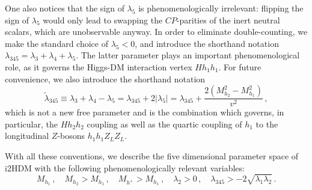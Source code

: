 One also notices that the sign of $\lambda_5$ is phenomenologically irrelevant: 
flipping the sign of $\lambda_5$ would only lead to swapping the $CP$-parities
of the inert neutral scalars, which are unobservable anyway.
In order to eliminate double-counting, we make the standard choice of $\lambda_5 < 0$,
and introduce the shorthand notation $\lambda_{345}=\lambda_3+\lambda_4+\lambda_5$.
The latter parameter plays an important phenomenological role, as it governs the Higgs-DM interaction vertex $H h_1 h_1$.
For future convenience, we also introduce the shorthand notation
\begin{equation}
\tilde\lambda_{345} \equiv \lambda_3+\lambda_4-\lambda_5 = \lambda_{345} + 2|\lambda_5| = 
\lambda_{345} + \frac{2(M_{h_2}^2-M_{h_1}^2)}{v^2}\,,
\label{tildelam345}
\end{equation}
which is not a new free parameter and is the combination which governs, in particular, 
the $Hh_2h_2$ coupling as well as the quartic coupling of $h_1$ to the longitudinal $Z$-bosons
$h_1 h_1 Z_L Z_L$.

With all these conventions, we describe the five dimensional parameter space of i2HDM
with the following phenomenologically relevant variables: 
\begin{equation}
\label{eq:model-parameters}
M_{h_1}\,,\quad M_{h_2} > M_{h_1}\,,\quad M_{h^+} > M_{h_1}\,, \quad \lambda_2 > 0\,,\quad \lambda_{345} > -2\sqrt{\lambda_1\lambda_2}\,.
\end{equation}

